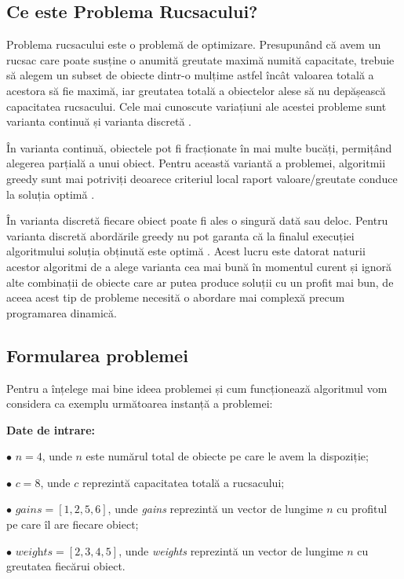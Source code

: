 \begin{sloppypar}
\subsection*{Ce este Problema Rucsacului?}
Problema rucsacului este o problemă de optimizare. Presupunând că avem un rucsac care poate susține o anumită greutate maximă numită capacitate, trebuie să alegem un subset de obiecte dintr-o mulțime astfel încât valoarea totală a acestora să fie maximă, iar greutatea totală a obiectelor alese să nu depășească capacitatea rucsacului. Cele mai cunoscute variațiuni ale acestei probleme sunt varianta continuă și varianta discretă \cite{Algorithm-Design}. \par 
În varianta continuă, obiectele pot fi fracționate în mai multe bucăți, permițând alegerea parțială a unui obiect. Pentru această variantă a problemei, algoritmii greedy sunt mai potriviți deoarece criteriul local raport valoare/greutate conduce la soluția optimă \cite{Algorithm-Design}. \par
În varianta discretă fiecare obiect poate fi ales o singură dată sau deloc. Pentru varianta discretă abordările greedy nu pot garanta că la finalul execuției algoritmului soluția obținută este optimă \cite{Algorithm-Design}. Acest lucru este datorat naturii acestor algoritmi de a alege varianta cea mai bună în momentul curent și ignoră alte combinații de obiecte care ar putea produce soluții cu un profit mai bun, de aceea acest tip de probleme necesită o abordare mai complexă precum programarea dinamică. \\

\subsection*{Formularea problemei}
Pentru a înțelege mai bine ideea problemei și cum funcționează algoritmul vom considera ca exemplu următoarea instanță a problemei:
\begin{textbox}
\textbf{Date de intrare:} \par
$\bullet$ $n = 4$, unde $n$ este numărul total de obiecte pe care le avem la dispoziție; \par
$\bullet$ $c = 8$, unde $c$ reprezintă capacitatea totală a rucsacului; \par
$\bullet$ $\textit{gains} = [1, 2, 5, 6]$, unde \textit{gains} reprezintă un vector de lungime $n$ cu profitul pe care îl are fiecare obiect; \par
$\bullet$ $\textit{weights} = [2, 3, 4, 5]$, unde \textit{weights} reprezintă un vector de lungime $n$ cu greutatea fiecărui obiect.
\end{textbox}


\end{sloppypar}
